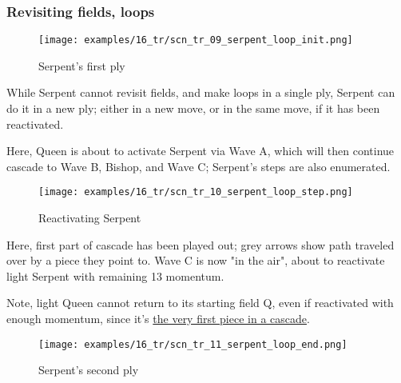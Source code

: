 \clearpage %

\subsubsection*{Revisiting fields, loops}
\label{sec:Tamoanchan Revisited/Serpent/Movement/Revisiting fields, loops}

\vspace*{-1.2\baselineskip}
\noindent
\begin{figure}[!h]
\texttt{[image: examples/16\_tr/scn\_tr\_09\_serpent\_loop\_init.png]}
\caption{Serpent's first ply}
\label{fig:scn_tr_09_serpent_loop_init}
\end{figure}

While Serpent cannot revisit fields, and make loops in a single ply, Serpent can
do it in a new ply; either in a new move, or in the same move, if it has been
reactivated.

Here, Queen is about to activate Serpent via Wave A, which will then continue
cascade to Wave B, Bishop, and Wave C; Serpent's steps are also enumerated.

\clearpage %

\vspace*{-2.1\baselineskip}
\noindent
\begin{figure}[!h]
\texttt{[image: examples/16\_tr/scn\_tr\_10\_serpent\_loop\_step.png]}
\caption{Reactivating Serpent}
\label{fig:scn_tr_10_serpent_loop_step}
\end{figure}

Here, first part of cascade has been played out; grey arrows show path traveled
over by a piece they point to. Wave C is now "in the air", about to reactivate
light Serpent with remaining 13 momentum.

Note, light Queen cannot return to its starting field Q, even if reactivated with
enough momentum, since it's
\hyperref[fig:scn_mv_053_static_move_is_illegal_init]{the very first piece in a cascade}.

\clearpage %

\vspace*{-2.1\baselineskip}
\noindent
\begin{figure}[!h]
\texttt{[image: examples/16\_tr/scn\_tr\_11\_serpent\_loop\_end.png]}
\caption{Serpent's second ply}
\label{fig:scn_tr_11_serpent_loop_end}
\end{figure}

